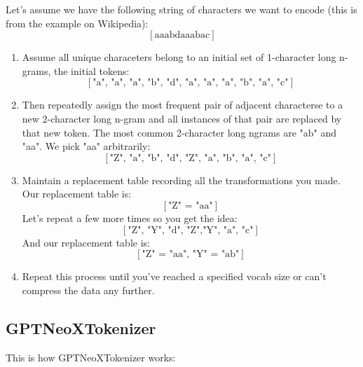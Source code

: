 \documentclass[12pt]{article}
\begin{document}
Let's assume we have the following string of characters we want to encode (this is from the example on Wikipedia): 
\[[\text{aaabdaaabac}]\]
\begin{enumerate}
\item Assume all unique characeters belong to an initial set of 1-character long n-grams, the initial tokens: \\
\[[\text{"a", "a", "a", "b", "d", "a", "a", "a", "b", "a", "c"}]\]
\item Then repeatedly assign the most frequent pair of adjacent characterse to a new 2-character long n-gram and all instances of that pair are replaced by that new token. The most common 2-character long ngrams are "ab" and "aa". We pick "aa" arbitrarily: \\
\[[\text{"Z", "a", "b", "d", "Z", "a", "b", "a", "c"}]\]
\item Maintain a replacement table recording all the transformations you made. Our replacement table is:
\[[\text{"Z"  = "aa"}]\]
Let's repeat a few more times so you get the idea:
\[[\text{"Z", "Y", "d", "Z","Y", "a", "c"}]\]
And our replacement table is:
\[[\text{"Z"  = "aa", "Y" = "ab"}]\]
\item Repeat this process until you've reached a specified vocab size or can't compress the data any further. 
\end{enumerate}
\subsection{GPTNeoXTokenizer}
This is how GPTNeoXTokenizer works:
\end{document}
